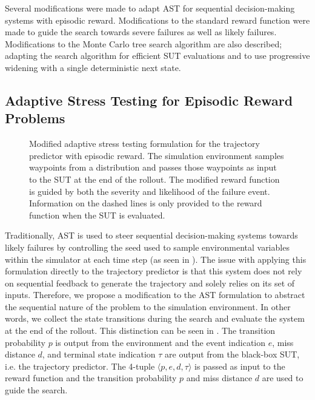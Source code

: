Several modifications were made to adapt AST for sequential decision-making systems with episodic reward.
Modifications to the standard reward function were made to guide the search towards severe failures as well as likely failures.
Modifications to the Monte Carlo tree search algorithm are also described; adapting the search algorithm for efficient SUT evaluations and to use progressive widening with a single deterministic next state.%


\subsection{Adaptive Stress Testing for Episodic Reward Problems} \label{sec:ast_approach_ast}

\begin{figure*}[!b]
  \centering
  \resizebox{0.95\textwidth}{!}{}
  \caption{
    \label{fig:ast_mdp_modified}
    Modified adaptive stress testing formulation for the trajectory predictor with episodic reward. The simulation environment samples waypoints from a distribution and passes those waypoints as input to the SUT at the end of the rollout.
    The modified reward function is guided by both the severity and likelihood of the failure event. Information on the dashed lines is only provided to the reward function when the SUT is evaluated.
  }
\end{figure*}

Traditionally, AST is used to steer sequential decision-making systems towards likely failures by controlling the seed used to sample environmental variables within the simulator at each time step (as seen in ).
The issue with applying this formulation directly to the trajectory predictor is that this system does not rely on sequential feedback to generate the trajectory and solely relies on its set of inputs. 
Therefore, we propose a modification to the AST formulation to abstract the sequential nature of the problem to the simulation environment.
In other words, we collect the state transitions during the search and evaluate the system at the end of the rollout.
This distinction can be seen in .
The transition probability $p$ is output from the environment and the event indication $e$, miss distance $d$, and terminal state indication $\tau$ are output from the black-box SUT, i.e. the trajectory predictor.
The 4-tuple $\langle p, e, d, \tau \rangle$ is passed as input to the reward function and the transition probability $p$ and miss distance $d$ are used to guide the search.


